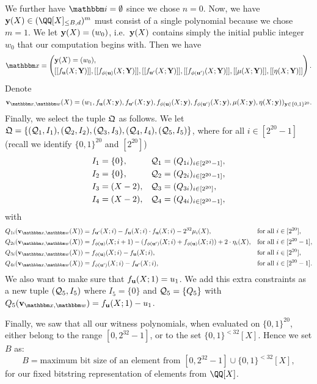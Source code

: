 \documentclass[11pt,letterpaper,usenames,dvipsnames]{article}
\begin{document}
We further have $\idx = \emptyset$ since we chose $n=0$. Now, we have $\yy(X) \in \mainQpolyring^m$ must consist of a single polynomial because we chose $m=1$. We let $\mathbf{y}(X) = (w_0)$, i.e.\ $\mathbf{y}(X)$ contains simply the initial public integer $w_0$ that our computation begins with. Then we have $$\inp = \left(\begin{aligned}&\yy(X)=(w_0),\\ &\oracle{f_{\uu}(X;\YY)}, \oracle{f_{\phi(\uu)}(X;\YY)}, \oracle{f_{\uu'}(X;\YY)}, \oracle{f_{\phi(\uu')}(X;\YY)}, \oracle{\mu(X;\YY)}, \oracle{\eta(X;\YY)}\end{aligned}\right).$$
%
Denote
%
$$
\vv_{\inp,\wit}(X)=(w_1, f_{\uu}(X;\yy), f_{\uu'}(X;\yy), f_{\phi(\uu)}(X;\yy), f_{\phi(\uu')}(X;\yy), \mu(X;\yy), \eta(X;\yy))_{\yy\in \{0,1\}^{20}}.
$$
Finally, we select the tuple $\mathfrak{Q}$ as follows. We let $\mathfrak{Q}=\{(\mathcal{Q}_1, I_1), (\mathcal{Q}_2, I_2), (\mathcal{Q}_3, I_3), (\mathcal{Q}_4, I_4), (\mathcal{Q}_5, I_5)\}$,
where for all $i\in [2^{20}-1]$ (recall we identify $\{0,1\}^{20}$ and $[2^{20}]$)
%
\begin{align*}
  &I_1 = \{0\}, &&\mathcal{Q}_1=(Q_{1i})_{i\in [2^{20}-1]},\\
  &I_2 = \{0\}, &&\mathcal{Q}_2=(Q_{2i})_{i\in [2^{20}-1]},\\
  &I_3 =(X-2), &&\mathcal{Q}_3=(Q_{3i})_{i\in [2^{20}]},\\
    &I_4 =(X-2), &&\mathcal{Q}_4=(Q_{4i})_{i\in [2^{20}-1]},
\end{align*}
with
\begin{align*}
  Q_{1i}(\vv_{\inp,\wit}(X))&=f_{\uu'}(X; i) - f_{\uu}(X;i)\cdot f_{\uu}(X;i) - 2^{32} \mu_i(X),&& \text{for all } i\in [2^{20}],\\
  Q_{2i}(\vv_{\inp,\wit}(X))&=f_{\phi(\uu)}(X; i+1) - (f_{\phi(\uu')}(X;i) + f_{\phi(\uu)}(X;i)) + 2\cdot \eta_i(X),&& \text{for all } i\in [2^{20}-1],\\
  Q_{3i}(\vv_{\inp,\wit}(X))&=f_{\phi(\uu)}(X;i)-f_{\uu}(X;i), && \text{for all } i\in [2^{20}],\\
  Q_{4i}(\vv_{\inp,\wit}(X))&=f_{\phi(\uu')}(X;i)-f_{\uu'}(X;i), && \text{for all } i\in [2^{20}-1].
\end{align*}
We also want to make sure that $f_{\mathbf{u}}(X; 1)= u_1$. We add this extra constraints as a new tuple  $(\mathcal{Q}_5, I_5)$ where $I_5=\{0\}$ and $\mathcal{Q}_5=\{Q_5\}$ with $Q_5(\vv_{\inp,\wit})= f_{\uu}(X;1)-u_1$.

Finally, we saw that all our witness polynomials, when evaluated on $\{0,1\}^{20}$, either belong to the range $[0, 2^{32}-1]$, or to the set $\{0,1\}^{< 32}[X]$. Hence we set $B$ as:
%
$$
B=\text{maximum bit size of an element from } [0,2^{32}-1] \cup \{0,1\}^{< 32}[X],
$$
for our fixed bitstring representation of elements from $\QQ[X]$.
\end{document}
